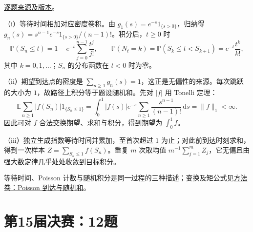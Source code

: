 \href{https://github.com/lzxcr/cmc-mathematics/blob/64916fa1fdbc3e444a652eca204d5669058ee321/src/problems/finals/14/15.md}{逐题来源及版本}。

\begin{solve}

（i）等待时间相加对应密度卷积。由 $g_1(s)=e^{-s}1_{\{s>0\}}$，归纳得 $g_n(s)=s^{n-1}e^{-s}1_{\{s>0\}}/(n-1)!$。积分后，$t\ge0$ 时
\[
\mathbb P(S_n\le t)=1-e^{-t}\sum_{j=0}^{n-1}\frac{t^j}{j!},
\qquad
\mathbb P(N_t=k)=\mathbb P(S_k\le t<S_{k+1})=e^{-t}\frac{t^k}{k!},
\]
其中 $k=0,1,\dots$；$S_n$ 的分布函数在 $t<0$ 时为零。

（ii）期望到达点的密度是 $\sum_{n\ge1}g_n(s)=1$，这正是无偏性的来源。每次跳跃的大小为 $1$，故路径上积分等于题设随机和。先对 $|f|$ 用 Tonelli 定理：
\[
\mathbb E\sum_{n\ge1}|f(S_n)|1_{\{S_n\le1\}}
=\int_0^1|f(s)|e^{-s}\sum_{n\ge1}\frac{s^{n-1}}{(n-1)!}\,\mathrm ds
=\|f\|_1<\infty.
\]
因此可对 $f$ 合法交换期望、求和与积分，得到期望为 $\int_0^1f$。

（iii）独立生成指数等待时间并累加，至首次超过 $1$ 为止；对此前到达时刻求和，得到一次样本 $Z=\sum_{S_n\le1}f(S_n)$。重复 $m$ 次取均值 $m^{-1}\sum_{j=1}^mZ_j$，它无偏且由强大数定律几乎处处收敛到目标积分。

等待时间、Poisson 计数与随机积分是同一过程的三种描述；变换及矩公式见\hyperref[app:probability-poisson]{方法卷：Poisson 到达与随机和}。

\end{solve}

\section{第15届决赛：12题}\label{pr:fin15-high:12}

